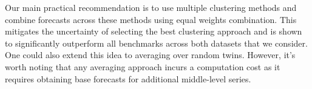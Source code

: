 \documentclass[a4paper,review,12pt,authoryear]{elsarticle}
\begin{document}
Our main practical recommendation is to use multiple clustering methods and combine forecasts across these methods using equal weights combination. 
This mitigates the uncertainty of selecting the best clustering approach and is shown to significantly outperform all benchmarks across both datasets that we consider. %
One could also extend this idea to averaging over random twins. However, it's worth noting that any averaging approach incurs a computation cost as it requires obtaining base forecasts for additional middle-level series.


\end{document}

